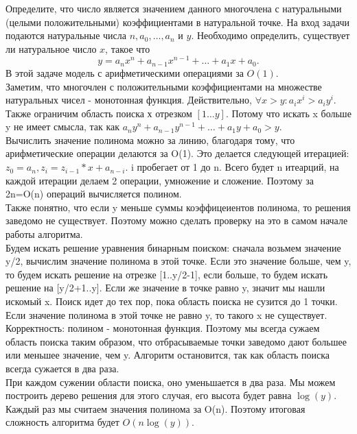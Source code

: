 \documentclass[12pt]{extreport}
\theoremstyle{definiton}
\theoremstyle{definition}
\theoremstyle{definition}
\begin{document}
	\Pr[4] Определите, что число является значением данного многочлена с натуральными (целыми положительными) коэффициентами в натуральной точке. На вход задачи подаются натуральные числа $n, a_0, \ldots, a_n$ и $y$. Необходимо определить, существует ли натуральное число $x$, такое что $$ y = a_n x^n + a_{n-1} x^{n-1} + \ldots + a_1x +  a_0. $$   
В этой задаче модель с арифметическими операциями за $O(1)$.
    \newline
    \\ Заметим, что многочлен с положительными коэффициентами на множестве натуральных чисел - монотонная функция. Действительно, $\forall x>y:a_ix^i >a_iy^i$.
    \\ Также ограничим область поиска х отрезком $[1 \ldots y]$. Потому что искать x больше y не имеет смысла, так как $a_n y^n + a_{n-1} y^{n-1} + \ldots + a_1y +  a_0>y$.
    \\ Вычислить значение полинома можно за линию, благодаря тому, что арифметические операции делаются за O(1). Это делается следующей итерацией: $z_0 = a_n, z_i = z_{i-1}*x+a_{n-i}$. i пробегает от 1 до n. Всего будет n итеарций, на каждой итерации делаем 2 операции, умножение и сложение. Поэтому за 2n=O(n) операций вычисляется полином.
    \\ Также понятно, что если y меньше суммы коэффицеиентов полинома, то решения заведомо не существует. Поэтому можно сделать проверку на это в самом начале работы алгоритма.
    \\ Будем искать решение уравнения бинарным поиском: сначала возьмем значение y/2, вычислим значение полинома в этой точке. Если это значение больше, чем y, то будем искать решение на отрезке [1..y/2-1], если больше, то будем искать решение на [y/2+1..y]. Если же значение в точке равно y, значит мы нашли искомый x. Поиск идет до тех пор, пока область поиска не сузится до 1 точки. Если значение полинома в этой точке не равно y, то такого x не существует.
    \\ Корректность: полином - монотонная функция. Поэтому мы всегда сужаем область поиска таким образом, что отбрасываемые точки заведомо дают большее или меньшее значение, чем y. Алгоритм остановится, так как область поиска всегда сужается в два раза.
    \\ При каждом сужении области поиска, оно уменьшается в два раза. Мы можем построить дерево решения для этого случая, его высота будет равна $\log(y)$. Каждый раз мы считаем значения полинома за O(n). Поэтому итоговая сложность алгоритма будет $O(n\log(y))$.
	
\end{document}
